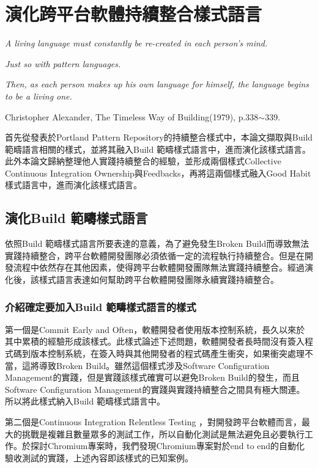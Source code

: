 \chapter{演化跨平台軟體持續整合樣式語言}
\vfill

\textit{A living language must constantly be re-created in each person's mind.}

\textit{Just so with pattern languages.}

\textit{Then, as each person makes up his own language for himself, the language begins to be a living one.}

\begin{flushright}
Christopher Alexander, The Timeless Way of Building(1979), p.338$\sim$339.\end{flushright}
\vfill
首先從發表於Portland Pattern Repository的持續整合樣式中，本論文擷取與Build 範疇語言相關的樣式，並將其融入Build 範疇樣式語言中，進而演化該樣式語言。此外本論文歸納整理他人實踐持續整合的經驗，並形成兩個樣式Collective Continuous Integration Ownership與Feedbacks，再將這兩個樣式融入Good Habit樣式語言中，進而演化該樣式語言。

\section{演化Build 範疇樣式語言}
依照Build 範疇樣式語言所要表達的意義，為了避免發生Broken Build而導致無法實踐持續整合，跨平台軟體開發團隊必須依循一定的流程執行持續整合。但是在開發流程中依然存在其他因素，使得跨平台軟體開發團隊無法實踐持續整合。經過演化後，該樣式語言表達如何幫助跨平台軟體開發團隊永續實踐持續整合。

\subsection{介紹確定要加入Build 範疇樣式語言的樣式}
第一個是Commit Early and Often，軟體開發者使用版本控制系統，長久以來於其中累積的經驗形成該樣式。此樣式論述下述問題，軟體開發者長時間沒有簽入程式碼到版本控制系統，在簽入時與其他開發者的程式碼產生衝突，如果衝突處理不當，這將導致Broken Build。雖然這個樣式涉及Software Configuration Management的實踐，但是實踐該樣式確實可以避免Broken  Build的發生，而且Software Configuration Management的實踐與實踐持續整合之間具有極大關連。所以將此樣式納入Build 範疇樣式語言中。

第二個是Continuous Integration Relentless Testing ，對開發跨平台軟體而言，最大的挑戰是複雜且數量眾多的測試工作，所以自動化測試是無法避免且必要執行工作。於探討Chromium專案時，我們發現Chromium專案對於end to end的自動化驗收測試的實踐，上述內容即該樣式的已知案例。

